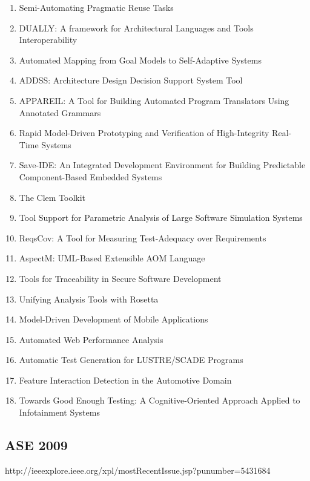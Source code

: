 \begin{enumerate}[itemsep=-1ex]
  \item Semi-Automating Pragmatic Reuse Tasks
  \item DUALLY: A framework for Architectural Languages and Tools Interoperability
  \item Automated Mapping from Goal Models to Self-Adaptive Systems
  \item ADDSS: Architecture Design Decision Support System Tool
  \item APPAREIL: A Tool for Building Automated Program Translators Using Annotated Grammars
  \item Rapid Model-Driven Prototyping and Verification of High-Integrity Real-Time Systems
  \item Save-IDE: An Integrated Development Environment for Building Predictable Component-Based Embedded Systems
  \item The Clem Toolkit
  \item Tool Support for Parametric Analysis of Large Software Simulation Systems
  \item ReqsCov: A Tool for Measuring Test-Adequacy over Requirements
  \item AspectM: UML-Based Extensible AOM Language
  \item Tools for Traceability in Secure Software Development
  \item Unifying Analysis Tools with Rosetta
  \item Model-Driven Development of Mobile Applications
  \item Automated Web Performance Analysis
  \item Automatic Test Generation for LUSTRE/SCADE Programs
  \item Feature Interaction Detection in the Automotive Domain
  \item Towards Good Enough Testing: A Cognitive-Oriented Approach Applied to Infotainment Systems
\end{enumerate}

\subsection{ASE 2009}

http://ieeexplore.ieee.org/xpl/mostRecentIssue.jsp?punumber=5431684

